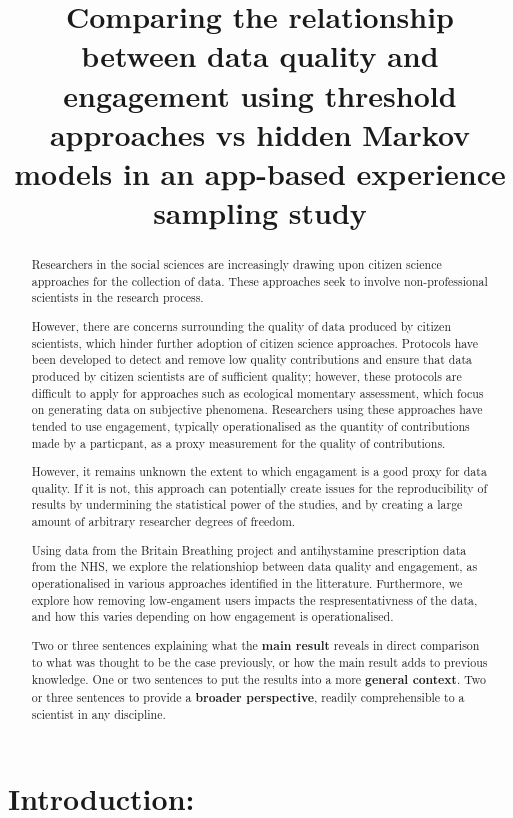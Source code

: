 \documentclass[
]{article}
\title{Comparing the relationship between data quality and engagement
using threshold approaches vs hidden Markov models in an app-based
experience sampling study}
\author{}
\date{\vspace{-2.5em}}
\begin{document}
\maketitle
\begin{abstract}
Researchers in the social sciences are increasingly drawing upon citizen
science approaches for the collection of data. These approaches seek to
involve non-professional scientists in the research process.

However, there are concerns surrounding the quality of data produced by
citizen scientists, which hinder further adoption of citizen science
approaches. Protocols have been developed to detect and remove low
quality contributions and ensure that data produced by citizen
scientists are of sufficient quality; however, these protocols are
difficult to apply for approaches such as ecological momentary
assessment, which focus on generating data on subjective phenomena.
Researchers using these approaches have tended to use engagement,
typically operationalised as the quantity of contributions made by a
particpant, as a proxy measurement for the quality of contributions.

However, it remains unknown the extent to which engagament is a good
proxy for data quality. If it is not, this approach can potentially
create issues for the reproducibility of results by undermining the
statistical power of the studies, and by creating a large amount of
arbitrary researcher degrees of freedom.

Using data from the Britain Breathing project and antihystamine
prescription data from the NHS, we explore the relationshiop between
data quality and engagement, as operationalised in various approaches
identified in the litterature. Furthermore, we explore how removing
low-engament users impacts the respresentativness of the data, and how
this varies depending on how engagement is operationalised.

Two or three sentences explaining what the \textbf{main result} reveals
in direct comparison to what was thought to be the case previously, or
how the main result adds to previous knowledge. One or two sentences to
put the results into a more \textbf{general context}. Two or three
sentences to provide a \textbf{broader perspective}, readily
comprehensible to a scientist in any discipline.
\end{abstract}

\hypertarget{introduction}{%
\section{Introduction:}\label{introduction}}
\end{document}
